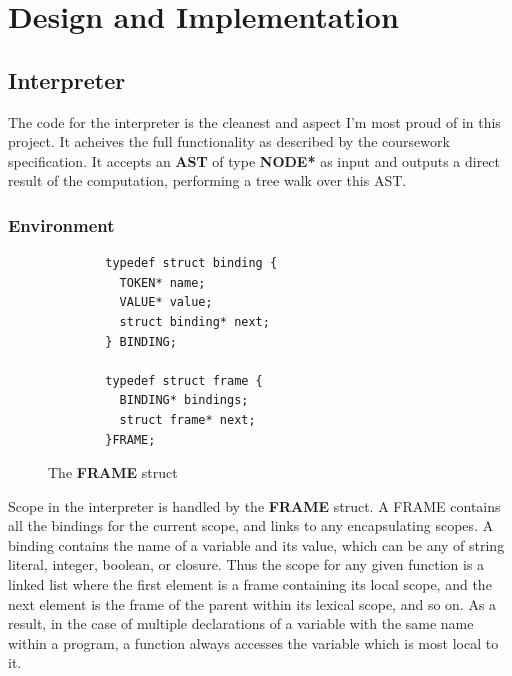 \documentclass[12pt]{article}
\begin{document}
\section{Design and Implementation}

\subsection{Interpreter}
The code for the interpreter is the cleanest and aspect I'm most proud of in this project. It acheives the full functionality as described by the coursework specification.
It accepts an \textbf{AST} of type \textbf{NODE*} as input and outputs a direct result of the computation, performing a tree walk over this AST.
\subsubsection{Environment}\label{env}
\begin{figure}[H]
    \begin{verbatim}
        typedef struct binding {
          TOKEN* name;
          VALUE* value;
          struct binding* next;
        } BINDING;
        
        typedef struct frame {
          BINDING* bindings;
          struct frame* next;
        }FRAME;
        \end{verbatim}
        \caption{The \textbf{FRAME} struct}
        \label{frame}
\end{figure}
Scope in the interpreter is handled by the \textbf{FRAME} struct. A FRAME contains all the bindings for the current scope, and links to any encapsulating scopes. A binding contains the name of a variable and its value, which can be any of string literal, integer, boolean, or closure.
Thus the scope for any given function is a linked list where the first element is a frame containing its local scope, and the next element is the frame of the parent within its lexical scope, and so on. As a result, in the case of multiple declarations of a variable with the same name within a program, a function always accesses the variable which is most local to it.
\end{document}
